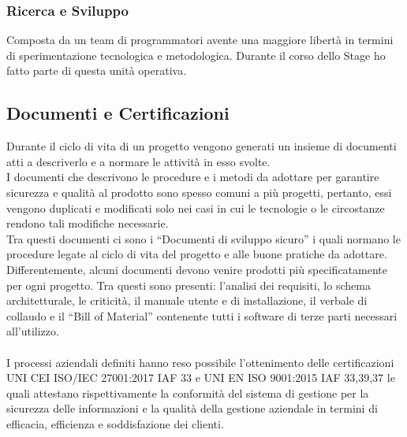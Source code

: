 \subsubsection*{Ricerca e Sviluppo}
Composta da un team di programmatori avente una maggiore libertà in termini di sperimentazione tecnologica e metodologica. Durante il corso dello Stage ho fatto parte di questa unità operativa. 

\subsection{Documenti e Certificazioni}
Durante il ciclo di vita di un progetto vengono generati un insieme di documenti atti a descriverlo e a normare le attività in esso svolte.\\
I documenti che descrivono le procedure e i metodi da adottare per garantire sicurezza e qualità al prodotto sono spesso comuni a più progetti, pertanto, essi vengono duplicati e modificati solo nei casi in cui le tecnologie o le circostanze rendono tali modifiche necessarie.\\
Tra questi documenti ci sono i “Documenti di sviluppo sicuro” i quali normano le procedure legate al ciclo di vita del progetto e alle buone pratiche da adottare.\\ 
Differentemente, alcuni documenti devono venire prodotti più specificatamente per ogni progetto. Tra questi sono presenti: l'analisi dei requisiti, lo schema architetturale, le criticità, il manuale utente e di installazione, il verbale di collaudo e il “Bill of Material” contenente tutti i software di terze parti necessari all'utilizzo.\\\\
I processi aziendali definiti hanno reso possibile l'ottenimento delle certificazioni UNI CEI ISO/IEC 27001:2017 IAF 33 e UNI EN ISO 9001:2015 IAF 33,39,37 le quali attestano rispettivamente la conformità del sistema di gestione per la sicurezza delle informazioni e la qualità della gestione aziendale in termini di efficacia, efficienza e soddisfazione dei clienti. 


